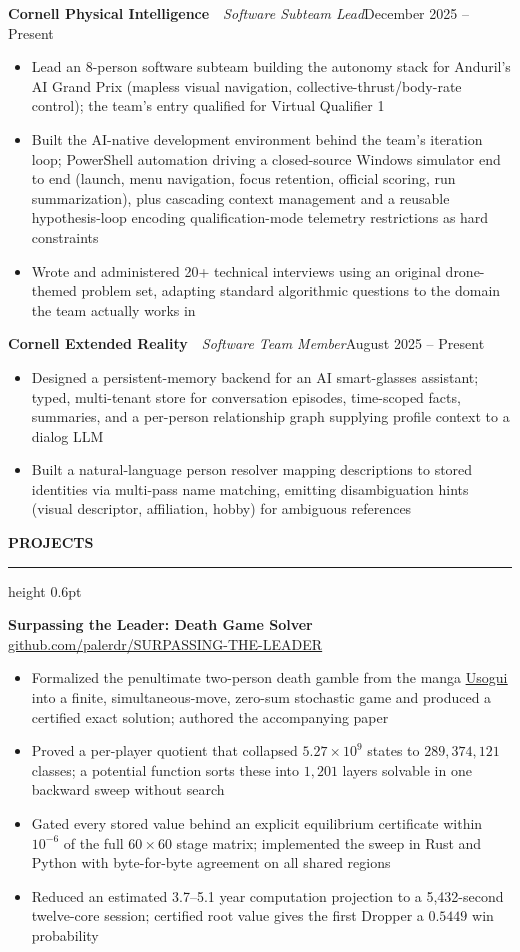 \documentclass[10pt,letterpaper]{article}
\providecommand{\uline}[1]{\underline{#1}}
\newlength{\sectiongap}   \setlength{\sectiongap}{5.0pt}  %
\newlength{\sectiondrop}  \setlength{\sectiondrop}{2.5pt} %
\newlength{\entrygap}     \setlength{\entrygap}{3.0pt}    %
\newcommand{\link}[2]{\href{#1}{\uline{\textcolor{linkblue}{#2}}}}
\newcommand{\resumesection}[1]{%
  \vspace{\sectiongap}%
  {\bfseries\MakeUppercase{#1}}\par
  \vspace{1.5pt}%
  {\color{rulegray}\hrule height 0.6pt}%
  \vspace{\sectiondrop}%
}
\newcommand{\entry}[3]{%
  \vspace{\entrygap}%
  \textbf{#1}\ \textcolor{rulegray}{\textbar}\ \textit{#2}\hfill #3\par
  \vspace{1.0pt}%
}
\newcommand{\project}[4][]{%
  \vspace{\entrygap}%
  \textbf{#2}%
  \ifx\relax#1\relax\else\ \textcolor{rulegray}{\textbar}\ \textbf{#1}\fi
  \hfill \link{#3}{#4}\par
  \vspace{1.0pt}%
}
\begin{document}
\entry{Cornell Physical Intelligence}{Software Subteam Lead}{December 2025 -- Present}
\begin{itemize}
  \item Lead an 8-person software subteam building the autonomy stack for Anduril's AI Grand Prix (mapless visual navigation, collective-thrust/body-rate control); the team's entry qualified for Virtual Qualifier 1
  \item Built the AI-native development environment behind the team's iteration loop; PowerShell automation driving a closed-source Windows simulator end to end (launch, menu navigation, focus retention, official scoring, run summarization), plus cascading context management and a reusable hypothesis-loop encoding qualification-mode telemetry restrictions as hard constraints
  \item Wrote and administered 20+ technical interviews using an original drone-themed problem set, adapting standard algorithmic questions to the domain the team actually works in
\end{itemize}

\entry{Cornell Extended Reality}{Software Team Member}{August 2025 -- Present}
\begin{itemize}
  \item Designed a persistent-memory backend for an AI smart-glasses assistant; typed, multi-tenant store for conversation episodes, time-scoped facts, summaries, and a per-person relationship graph supplying profile context to a dialog LLM
  \item Built a natural-language person resolver mapping descriptions to stored identities via multi-pass name matching, emitting disambiguation hints (visual descriptor, affiliation, hobby) for ambiguous references
\end{itemize}

\resumesection{Projects}

\project{Surpassing the Leader: Death Game Solver}%
        {https://github.com/palerdr/SURPASSING-THE-LEADER}{github.com/palerdr/SURPASSING-THE-LEADER}
\begin{itemize}
  \item Formalized the penultimate two-person death gamble from the manga \link{https://en.wikipedia.org/wiki/Usogui}{Usogui} into a finite, simultaneous-move, zero-sum stochastic game and produced a certified exact solution; authored the accompanying paper
  \item Proved a per-player quotient that collapsed $5.27\times10^{9}$ states to $289{,}374{,}121$ classes; a potential function sorts these into $1{,}201$ layers solvable in one backward sweep without search
  \item Gated every stored value behind an explicit equilibrium certificate within $10^{-6}$ of the full $60\times60$ stage matrix; implemented the sweep in Rust and Python with byte-for-byte agreement on all shared regions
  \item Reduced an estimated 3.7--5.1 year computation projection to a 5,432-second twelve-core session; certified root value gives the first Dropper a $0.5449$ win probability
\end{itemize}
\end{document}
